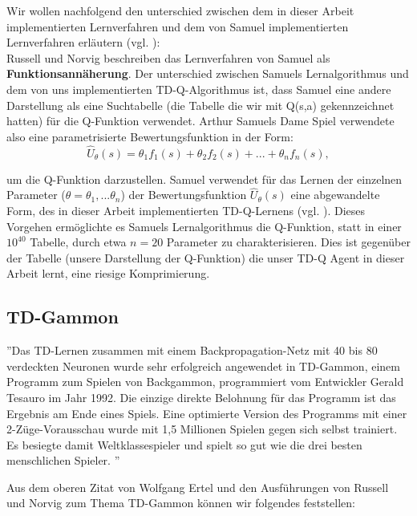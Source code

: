 Wir wollen nachfolgend den unterschied zwischen dem in dieser Arbeit implementierten Lernverfahren und dem von Samuel implementierten Lernverfahren erläutern (vgl. \cite[976]{Russell}): \\

Russell und Norvig beschreiben das Lernverfahren von Samuel als \textbf{Funktionsannäherung}. Der unterschied zwischen Samuels Lernalgorithmus und dem von uns implementierten TD-Q-Algorithmus ist, dass Samuel eine andere Darstellung als eine Suchtabelle (die Tabelle die wir mit Q(s,a) gekennzeichnet hatten) für die Q-Funktion verwendet. Arthur Samuels Dame Spiel verwendete also eine parametrisierte Bewertungsfunktion in der Form: \\
\begin{equation*}
\hat{U}_\theta(s) = \theta_1 f_1(s) + \theta_2 f_2(s) + ... + \theta_n f_n(s),
\end{equation*}

um die Q-Funktion darzustellen. Samuel verwendet für das Lernen der einzelnen Parameter ($\theta = \theta_1, ... \theta_n$) der Bewertungsfunktion $\hat{U}_\theta(s)$ eine abgewandelte Form, des in dieser Arbeit implementierten TD-Q-Lernens (vgl. \cite[981]{Russell}). Dieses Vorgehen ermöglichte es Samuels Lernalgorithmus die Q-Funktion, statt in einer $10^{40}$ Tabelle, durch etwa $n = 20$ Parameter zu charakterisieren. Dies ist gegenüber der Tabelle (unsere Darstellung der Q-Funktion) die unser TD-Q Agent in dieser Arbeit lernt, eine riesige Komprimierung. \\

\subsection{TD-Gammon}
\label{subsec:TD-Gammon}
''Das TD-Lernen zusammen mit einem Backpropagation-Netz mit 40 bis 80 verdeckten Neuronen wurde sehr erfolgreich angewendet in TD-Gammon, einem Programm zum Spielen von Backgammon, programmiert vom Entwickler Gerald Tesauro im Jahr 1992. Die einzige direkte Belohnung für das Programm ist das Ergebnis am Ende eines Spiels. Eine optimierte Version des Programms mit einer 2-Züge-Vorausschau wurde mit 1,5 Millionen Spielen gegen sich selbst trainiert. Es besiegte damit Weltklassespieler und spielt so gut wie die drei besten menschlichen Spieler. \cite[304]{Ertel}''

Aus dem oberen Zitat von Wolfgang Ertel und den Ausführungen von Russell und Norvig \cite[982]{Russell} zum Thema TD-Gammon können wir folgendes feststellen: \\

